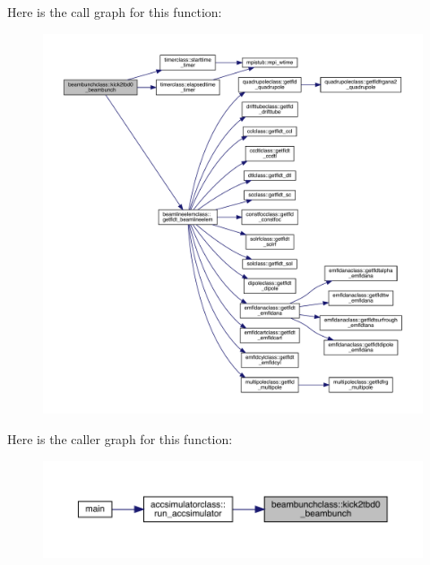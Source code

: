 Here is the call graph for this function\+:\nopagebreak
\begin{figure}[H]
\begin{center}
\leavevmode
\includegraphics[width=350pt]{namespacebeambunchclass_a38583f97e581a51940801aeb0f8398a0_cgraph}
\end{center}
\end{figure}
Here is the caller graph for this function\+:\nopagebreak
\begin{figure}[H]
\begin{center}
\leavevmode
\includegraphics[width=350pt]{namespacebeambunchclass_a38583f97e581a51940801aeb0f8398a0_icgraph}
\end{center}
\end{figure}
\mbox{\label{namespacebeambunchclass_a513182caa95677071325abf64bba8279}} 
